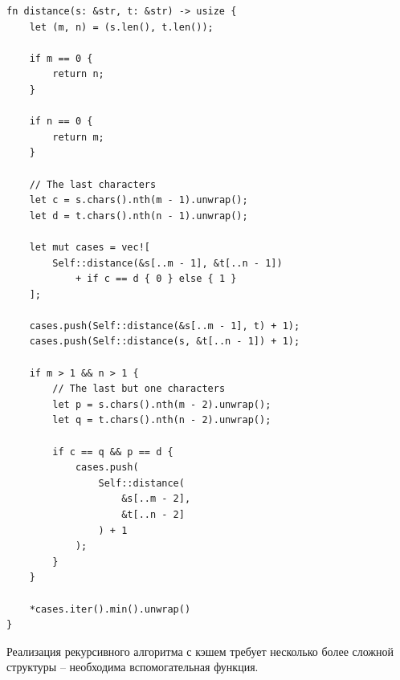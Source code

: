 \documentclass{report}
\begin{document}
\begin{lstlisting}[caption=Реализация простого рекурсивного
    алгоритма поиска $\Delta_{\textup{ДЛ}}$]
fn distance(s: &str, t: &str) -> usize {
    let (m, n) = (s.len(), t.len());

    if m == 0 {
        return n;
    }

    if n == 0 {
        return m;
    }

    // The last characters
    let c = s.chars().nth(m - 1).unwrap();
    let d = t.chars().nth(n - 1).unwrap();

    let mut cases = vec![
        Self::distance(&s[..m - 1], &t[..n - 1])
            + if c == d { 0 } else { 1 }
    ];

    cases.push(Self::distance(&s[..m - 1], t) + 1);
    cases.push(Self::distance(s, &t[..n - 1]) + 1);

    if m > 1 && n > 1 {
        // The last but one characters
        let p = s.chars().nth(m - 2).unwrap();
        let q = t.chars().nth(n - 2).unwrap();

        if c == q && p == d {
            cases.push(
                Self::distance(
                    &s[..m - 2],
                    &t[..n - 2]
                ) + 1
            );
        }
    }

    *cases.iter().min().unwrap()
}
\end{lstlisting}

Реализация рекурсивного алгоритма с кэшем требует несколько более
сложной структуры -- необходима вспомогательная функция.
\end{document}
